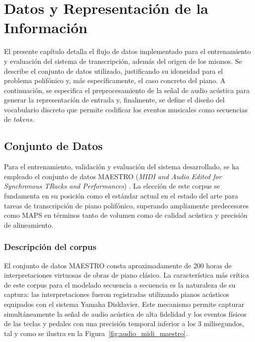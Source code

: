 \chapter{Datos y Representación de la Información}
\label{cap:datos}

El presente capítulo detalla el flujo de datos
implementado para el entrenamiento y evaluación del sistema de
transcripción, además del origen de los mismos. Se describe el conjunto
de datos utilizado, justificando su idoneidad para el problema polifónico
y, más específicamente, el caso concreto del piano. A continuación, se
especifica el preprocesamiento de la señal de audio acústica para generar
la representación de entrada y, finalmente, se define el diseño del
vocabulario discreto que permite codificar los eventos musicales como
secuencias de \textit{tokens}.

\section{Conjunto de Datos}
\label{sec:conjunto_datos}

Para el entrenamiento, validación y evaluación del sistema desarrollado,
se ha empleado el conjunto de datos MAESTRO (\textit{MIDI and Audio
Edited for Synchronous TRacks and Performances})
\cite{hawthorne2018enabling}. La elección de este corpus se fundamenta
en su posición como el estándar actual en el estado del arte para tareas
de transcripción de piano polifónico, superando ampliamente predecesores
como MAPS en términos tanto de volumen como de calidad acústica y
precisión de alineamiento.

\subsection{Descripción del corpus}

El conjunto de datos MAESTRO consta aproximadamente de 200 horas de
interpretaciones virtuosas de obras de piano clásico. La característica
más crítica de este corpus para el modelado secuencia a secuencia es la
naturaleza de su captura: las interpretaciones fueron registradas
utilizando pianos acústicos equipados con el sistema Yamaha Disklavier.
Este mecanismo permite capturar simultáneamente la señal de audio
acústica de alta fidelidad y los eventos físicos de las teclas y pedales
con una precisión temporal inferior a los 3 milisegundos, tal y como se
ilustra en la Figura~\ref{fig:audio_midi_maestro}.

